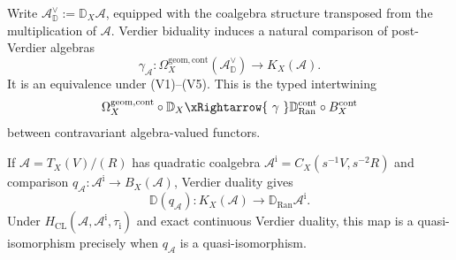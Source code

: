 \begin{theorem}
Write $\mathcal A_{\mathbb D}^{\vee}:=\mathbb D_X\mathcal A$, equipped
with the coalgebra structure transposed from the multiplication of
$\mathcal A$.  Verdier biduality induces a natural comparison of
post-Verdier algebras
\begin{equation}\label{eq:verdier-bar-cobar-typed-comparison}
\gamma_{\mathcal A}\colon
\Omega_X^{\mathrm{geom,cont}}(\mathcal A_{\mathbb D}^{\vee})
\longrightarrow K_X(\mathcal A).
\end{equation}
It is an equivalence under \textup{(V1)--(V5)}.  This is the typed
intertwining
\[
\Omega_X^{\mathrm{geom,cont}}\circ\mathbb D_X
\xRightarrow{\ \gamma\ }
\mathbb D_{\operatorname{Ran}}^{\mathrm{cont}}\circ B_X^{\mathrm{cont}}
\]
between contravariant algebra-valued functors.

If $\mathcal A=T_X(V)/(R)$ has quadratic coalgebra
$\mathcal A^{\mathrm i}=C_X(s^{-1}V,s^{-2}R)$ and comparison
$q_{\mathcal A}\colon\mathcal A^{\mathrm i}\to B_X(\mathcal A)$,
Verdier duality gives
\[
\mathbb D(q_{\mathcal A})\colon
K_X(\mathcal A)\longrightarrow
\mathbb D_{\operatorname{Ran}}\mathcal A^{\mathrm i}.
\]
Under $H_{\mathrm{CL}}(\mathcal A,\mathcal A^{\mathrm i},
\tau_{\mathrm i})$ and exact continuous Verdier duality, this map is a
quasi-isomorphism precisely when $q_{\mathcal A}$ is a
quasi-isomorphism.
\end{theorem}

